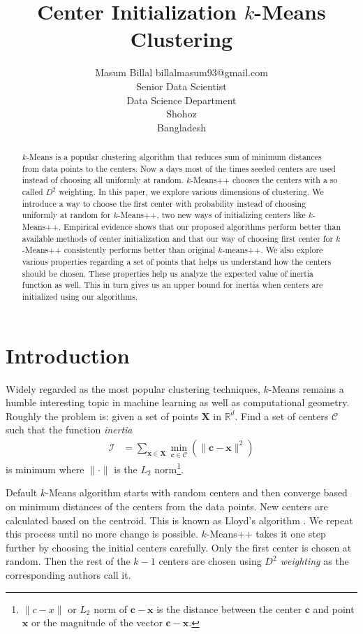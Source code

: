 \documentclass[twoside, 11pt]{article}
\title{Center Initialization $k$-Means Clustering}
\author{\name Masum Billal \email billalmasum93@gmail.com \\
	Senior Data Scientist\\
	\addr Data Science Department\\
	Shohoz\\
	Bangladesh}
\newcommand{\x}{\mathbf{x}}
\newcommand{\X}{\mathbf{X}}
\renewcommand{\c}{\mathbf{c}}
\newcommand{\C}{\mathcal{C}}
\begin{document}
	
	\maketitle
		\begin{abstract}%
			$k$-Means is a popular clustering algorithm that reduces sum of minimum distances from data points to the centers. Now a days most of the times seeded centers are used instead of choosing all uniformly at random. $k$-Means++ chooses the centers with a so called $D^2$ weighting. In this paper, we explore various dimensions of clustering. We introduce a way to choose the first center with probability instead of choosing uniformly at random for $k$-Means++, two new ways of initializing centers like $k$-Means++. Empirical evidence shows that our proposed algorithms perform better than available methods of center initialization and that our way of choosing first center for $k$-Means++ consistently performs better than original $k$-means++. We also explore various properties regarding a set of points that helps us understand how the centers should be chosen. These properties help us analyze the expected value of inertia function as well. This in turn gives us an upper bound for inertia when centers are initialized using our algorithms.
		\end{abstract}
	\section{Introduction}
	Widely regarded as the most popular clustering techniques, $k$-Means remains a humble interesting topic in machine learning as well as computational geometry. Roughly the problem is: given a set of points $\X$ in $\mathbb{R}^d$. Find a set of centers $\mathcal{C}$ such that the function \textit{inertia}
		\begin{align*}
			\mathcal{I} & = \sum_{\x\in\X}\min_{\c\in\C}(\|\c-\x\|^2)
		\end{align*}
	is minimum where $\|\cdot\|$ is the $L_2$ norm\footnote{$\|c-x\|$ or $L_2$ norm of $\c-\x$ is the distance between the center $\c$ and point $\x$ or the magnitude of the vector $\c-\x$.}.
	
	Default $k$-Means algorithm starts with random centers and then converge based on minimum distances of the centers from the data points. New centers are calculated based on the centroid. This is known as Lloyd's algorithm \citep{lloyd}. We repeat this process until no more change is possible. $k$-Means++ \citep{kmeans++} takes it one step further by choosing the initial centers carefully. Only the first center is chosen at random. Then the rest of the $k-1$ centers are chosen using \textit{$D^2$ weighting} as the corresponding authors call it. 
	
\end{document}
